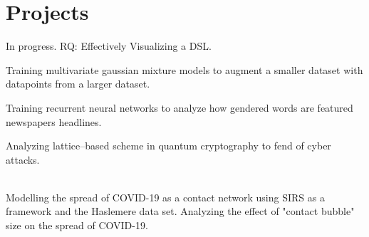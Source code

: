 \documentclass[letterpaper]{deedy-resume} %
\begin{document}
\begin{minipage}[t]{0.66\textwidth} %


\section{Projects}

In progress. RQ: Effectively Visualizing a DSL.

\sectionspace %

Training multivariate gaussian mixture models to augment a smaller dataset with datapoints from a larger dataset. 

\sectionspace %


Training recurrent neural networks to analyze how gendered words are featured newspapers headlines.


\vspace{\topsep} %


\sectionspace %


Analyzing lattice–based scheme in quantum cryptography to fend of cyber attacks.

\sectionspace %


\\
Modelling the spread of COVID-19 as a contact network using SIRS as a framework and the Haslemere data set. Analyzing the effect of "contact bubble" size on the spread of COVID-19.


\end{minipage}
\end{document}

